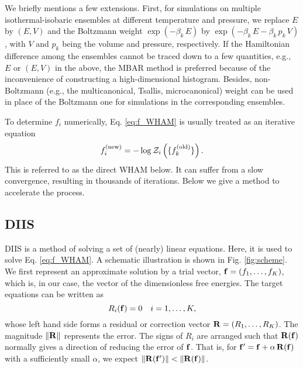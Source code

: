 \documentclass[reprint,superscriptaddress]{revtex4-1}
\begin{document}
We briefly mentions a few extensions.
%
First,
for simulations
on multiple isothermal-isobaric ensembles
at different temperature and pressure,
%
we replace $E$ by $(E, V)$
and the Boltzmann weight
$\exp(-\beta_k \, E)$
by
$\exp(-\beta_k \, E - \beta_k \, p_k \, V)$,
with
$V$ and $p_k$
being the volume and pressure,
respectively.
%
If the Hamiltonian difference among the ensembles
cannot be traced down to a few quantities,
e.g., $E$ or $(E, V)$ in the above,
the MBAR method is preferred\cite{
shirts2008}
because of the inconvenience
of constructing a high-dimensional histogram.
%
Besides,
non-Boltzmann
(e.g., the multicanonical\cite{
mezei1987, *berg1992, *lee1993},
Tsallis\cite{tsallis1988},
microcanonical\cite{
yan2003, *martin-mayor2007, *zhang2013})
weight
can be used in place of the Boltzmann one
for simulations in the corresponding ensembles.
%



To determine $f_i$ numerically,
Eq. \eqref{eq:f_WHAM}
is usually treated as an iterative equation
%
\begin{equation}
f_i^\mathrm{(new)}
=
-\log \mathcal{Z}_i\left(
  \{ f_k^\mathrm{(old)} \}
\right).
\end{equation}
%
This is referred to as
the direct WHAM below.
%
It can suffer from a slow convergence,
resulting in thousands of iterations\cite{
bereau2009, kim2011}.
%
Below we give a method to accelerate the process.





\subsection{DIIS}



DIIS is a method of solving a set of
(nearly) linear equations\cite{
pulay1980, *pulay1982, *hamilton1986,
kovalenko1999, howard2011}.
%
Here, it is used
to solve Eq. \eqref{eq:f_WHAM}.
%
A schematic illustration
is shown in Fig. \ref{fig:scheme}.
%
We first represent an approximate solution
by a trial vector,
$\mathbf{f} = (f_1, \dots, f_K)$,
which is, in our case, the vector of
the dimensionless free energies.
%
The target equations can be written as
%
\begin{equation}
  R_i(\mathbf{f}) = 0  \quad i = 1, \ldots, K,
  \label{eq:R_f}
\end{equation}
%
whose left hand side forms
a residual or correction vector
$\mathbf{R} = (R_1, \dots, R_K)$.
%
The magnitude
$\| \mathbf{R} \|$
represents the error.
%
The signs of $R_i$ are arranged such that
$\mathbf{R}(\mathbf{f})$
normally gives a direction
of reducing the error of $\mathbf{f}$.
%
That is,
for $\mathbf{f}' = \mathbf{f} + \alpha \, \mathbf{R}(\mathbf{f})$
with a sufficiently small $\alpha$,
we expect
%
$\| \mathbf{R}(\mathbf{f}') \| < \| \mathbf{R}(\mathbf{f}) \|$.
\end{document}
